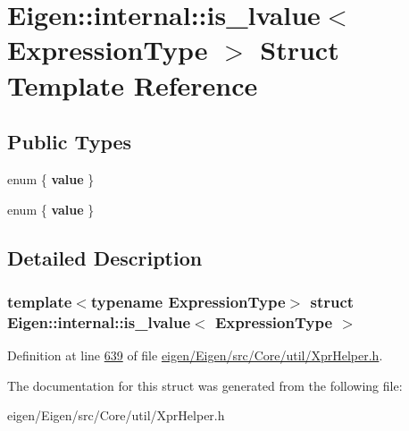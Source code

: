 \hypertarget{struct_eigen_1_1internal_1_1is__lvalue}{}\section{Eigen\+:\+:internal\+:\+:is\+\_\+lvalue$<$ Expression\+Type $>$ Struct Template Reference}
\label{struct_eigen_1_1internal_1_1is__lvalue}
\subsection*{Public Types}
\begin{DoxyCompactItemize}
\item 
\mbox{\label{struct_eigen_1_1internal_1_1is__lvalue_a6babd0f0a06c2c5e335ee93747a86d74}} 
enum \{ {\bfseries value}
 \}
\item 
\mbox{\label{struct_eigen_1_1internal_1_1is__lvalue_ac0b6892cfa5729ade865efc05e37df39}} 
enum \{ {\bfseries value}
 \}
\end{DoxyCompactItemize}


\subsection{Detailed Description}
\subsubsection*{template$<$typename Expression\+Type$>$\newline
struct Eigen\+::internal\+::is\+\_\+lvalue$<$ Expression\+Type $>$}



Definition at line \hyperlink{eigen_2_eigen_2src_2_core_2util_2_xpr_helper_8h_source_l00639}{639} of file \hyperlink{eigen_2_eigen_2src_2_core_2util_2_xpr_helper_8h_source}{eigen/\+Eigen/src/\+Core/util/\+Xpr\+Helper.\+h}.



The documentation for this struct was generated from the following file\+:\begin{DoxyCompactItemize}
\item 
eigen/\+Eigen/src/\+Core/util/\+Xpr\+Helper.\+h\end{DoxyCompactItemize}

